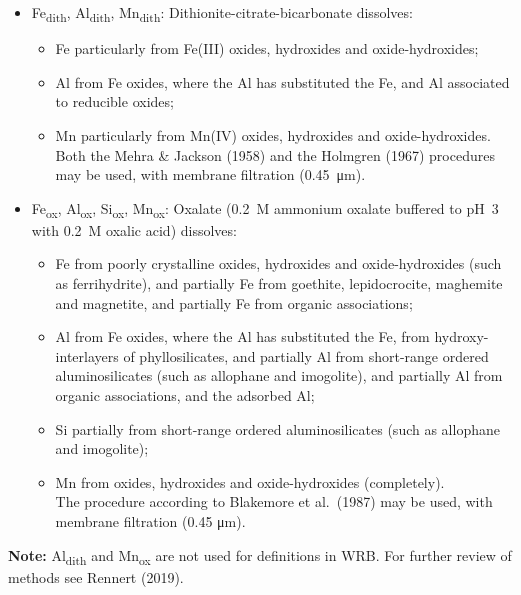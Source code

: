 \documentclass[
  letterpaper,
  DIV=11,
  numbers=noendperiod]{scrreprt}
\providecommand{\tightlist}{%
  \setlength{\itemsep}{0pt}\setlength{\parskip}{0pt}}\usepackage{longtable,booktabs,array}
\begin{document}
\begin{itemize}
\tightlist
\item
  Fe\textsubscript{dith}, Al\textsubscript{dith},
  Mn\textsubscript{dith}: Dithionite-citrate-bicarbonate dissolves:

  \begin{itemize}
  \tightlist
  \item
    Fe particularly from Fe(III) oxides, hydroxides and
    oxide-hydroxides;
  \item
    Al from Fe oxides, where the Al has substituted the Fe, and Al
    associated to reducible oxides;
  \item
    Mn particularly from Mn(IV) oxides, hydroxides and
    oxide-hydroxides.\\
    Both the Mehra \& Jackson (1958) and the Holmgren (1967) procedures
    may be used, with membrane filtration (0.45~μm).
  \end{itemize}
\item
  Fe\textsubscript{ox}, Al\textsubscript{ox}, Si\textsubscript{ox},
  Mn\textsubscript{ox}: Oxalate (0.2~M ammonium oxalate buffered to pH~3
  with 0.2~M oxalic acid) dissolves:

  \begin{itemize}
  \tightlist
  \item
    Fe from poorly crystalline oxides, hydroxides and oxide-hydroxides
    (such as ferrihydrite), and partially Fe from goethite,
    lepidocrocite, maghemite and magnetite, and partially Fe from
    organic associations;
  \item
    Al from Fe oxides, where the Al has substituted the Fe, from
    hydroxy-interlayers of phyllosilicates, and partially Al from
    short-range ordered aluminosilicates (such as allophane and
    imogolite), and partially Al from organic associations, and the
    adsorbed Al;
  \item
    Si partially from short-range ordered aluminosilicates (such as
    allophane and imogolite);
  \item
    Mn from oxides, hydroxides and oxide-hydroxides (completely).\\
    The procedure according to Blakemore et al.~(1987) may be used, with
    membrane filtration (0.45 μm).
  \end{itemize}
\end{itemize}

\textbf{Note:} Al\textsubscript{dith} and Mn\textsubscript{ox} are not
used for definitions in WRB. For further review of methods see Rennert
(2019).
\end{document}
